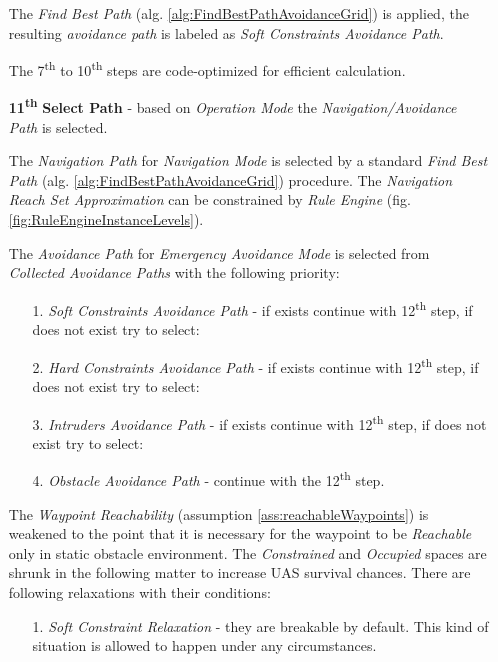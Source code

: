 \begin{itemize}
    The \emph{Find Best Path} (alg. \ref{alg:FindBestPathAvoidanceGrid}) is applied, the resulting \emph{avoidance path} is labeled as \emph{Soft Constraints Avoidance Path}.
    
    \begin{note}
        The 7\textsuperscript{th} to 10\textsuperscript{th} steps are code-optimized for efficient calculation.
    \end{note}
    
    \item[\textbf{11\textsuperscript{th}}] \textbf{Select Path} -  based on \emph{Operation Mode} the \emph{Navigation/Avoidance Path} is selected.
    
    The \emph{Navigation Path} for \emph{Navigation Mode} is selected by a standard \emph{Find Best Path} (alg. \ref{alg:FindBestPathAvoidanceGrid}) procedure. The \emph{Navigation Reach Set Approximation} can be constrained by \emph{Rule Engine} (fig. \ref{fig:RuleEngineInstanceLevels}).
    
    The \emph{Avoidance Path} for \emph{Emergency Avoidance Mode} is selected from \emph{Collected Avoidance Paths} with the following priority:
    \begin{itemize}
        \item[1.] \emph{Soft Constraints Avoidance Path} - if exists continue with 12\textsuperscript{th} step, if does not exist try to select:
        
        \item[2.] \emph{Hard Constraints Avoidance Path} - if exists continue with 12\textsuperscript{th} step, if does not exist try to select:
        
        \item[3.] \emph{Intruders Avoidance Path} - if exists continue with 12\textsuperscript{th} step, if does not exist try to select:
        
        \item[4.] \emph{Obstacle Avoidance Path} - continue with the 12\textsuperscript{th} step.
    \end{itemize}
    \begin{note}
        The \emph{Waypoint Reachability} (assumption \ref{ass:reachableWaypoints}) is weakened to the point that it is necessary for the waypoint to be \emph{Reachable} only in static obstacle environment. The \emph{Constrained} and \emph{Occupied} spaces are shrunk in the following matter to increase UAS survival chances. There are following relaxations with their conditions:
        \begin{itemize}
            \item[1.] \emph{Soft Constraint Relaxation} - they are breakable by default.  This kind of situation is allowed to happen under any circumstances. 
            

\end{itemize}
\end{note}
\end{itemize}
